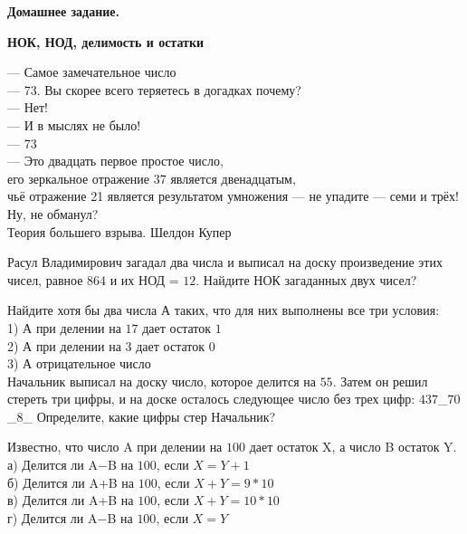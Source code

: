 \centerline{\bf \Huge Домашнее задание.}
\centerline{\bf \Huge НОК, НОД, делимость и остатки}

\begin{flushright}
        \scriptsize{— Самое замечательное число\\
                    — 73. Вы скорее всего теряетесь в догадках почему?\\
                    — Нет!\\
                    — И в мыслях не было!\\
                    — 73\\
                    — Это двадцать первое простое число,\\ его зеркальное отражение 37 является двенадцатым,\\ чьё отражение 21 является результатом умножения — не упадите — семи и трёх!\\ Ну, не обманул?\\
                    Теория большего взрыва. Шелдон Купер}
\end{flushright}


 Расул Владимирович загадал два числа и выписал на доску произведение этих чисел, равное $864$ и их НОД = $12$. Найдите НОК загаданных двух чисел?

 Найдите хотя бы два числа А таких, что для них выполнены все три условия:\\
1) А при делении на $17$ дает остаток $1$\\
2) А при делении на $3$ дает остаток $0$\\
3) А отрицательное число\\

 Начальник выписал на доску число, которое делится на $55$. Затем он решил стереть три цифры, и на доске осталось следующее число без трех цифр: $437$\_$70$\_$8$\_
Определите, какие цифры стер Начальник?
  
 Известно, что число A при делении на $100$ дает остаток X, а число B остаток Y.\\
а) Делится ли A$-$B на $100$, если $X=Y+1$\\
б) Делится ли A+B на $100$, если $X+Y=9*10$\\
в) Делится ли A+B на $100$, если $X+Y=10*10$\\
г) Делится ли A$-$B на $100$, если $X=Y$\\